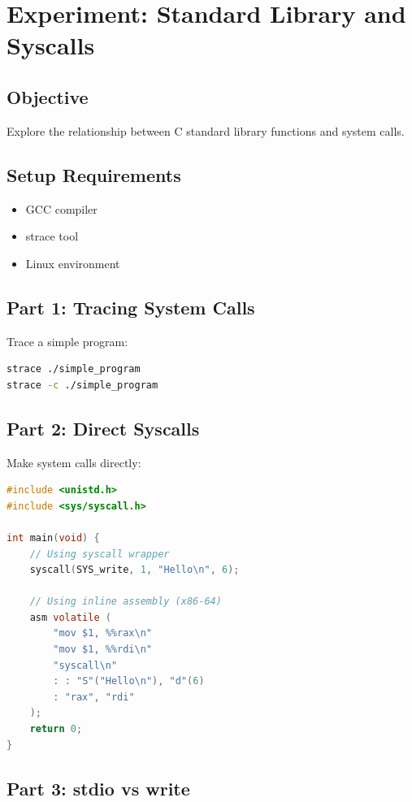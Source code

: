 \section{Experiment: Standard Library and Syscalls}

\subsection{Objective}
Explore the relationship between C standard library functions and system calls.

\subsection{Setup Requirements}
\begin{itemize}
\item GCC compiler
\item strace tool
\item Linux environment
\end{itemize}

\subsection{Part 1: Tracing System Calls}

Trace a simple program:

\begin{lstlisting}[language=bash]
strace ./simple_program
strace -c ./simple_program
\end{lstlisting}

\subsection{Part 2: Direct Syscalls}

Make system calls directly:

\begin{lstlisting}[language=C]
#include <unistd.h>
#include <sys/syscall.h>

int main(void) {
    // Using syscall wrapper
    syscall(SYS_write, 1, "Hello\n", 6);
    
    // Using inline assembly (x86-64)
    asm volatile (
        "mov $1, %%rax\n"
        "mov $1, %%rdi\n"
        "syscall\n"
        : : "S"("Hello\n"), "d"(6)
        : "rax", "rdi"
    );
    return 0;
}
\end{lstlisting}

\subsection{Part 3: stdio vs write}

